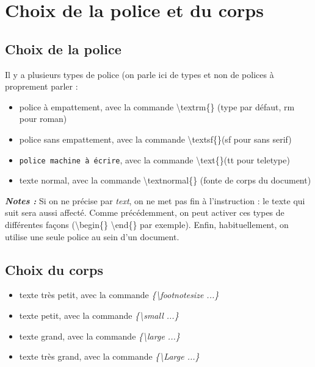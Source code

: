 \documentclass[a4paper, 10pt]{article}
\begin{document}
\section{Choix de la police et du corps}
\subsection{Choix de la police}
Il y a plusieurs types de police (on parle ici de types et non de polices à proprement parler :

\begin{itemize}

\item \textrm{police à empattement}, avec la commande \textbackslash textrm\{\} (type par défaut, rm pour roman)
\item \textsf{police sans empattement}, avec la commande \textbackslash textsf\{\}(sf pour sans serif)
\item \texttt{police machine à écrire}, avec la commande \textbackslash text\{\}(tt pour teletype)
\item \textnormal{texte normal}, avec la commande \textbackslash textnormal\{\} (fonte de corps du document)

\end{itemize}

\textit{\textbf{Notes :}} Si on ne précise par \textit{text}, on ne met pas fin à l'instruction : le texte qui suit sera aussi affecté.
Comme précédemment, on peut activer ces types de différentes façons (\textbackslash begin\{\} \textbackslash end\{\} par exemple). Enfin, habituellement, on utilise une seule police au sein d'un document.

\pagebreak %

\subsection{Choix du corps}

\begin{itemize}

\item {\footnotesize texte très petit}, avec la commande \textit{\{\textbackslash footnotesize ...\}}
\item {\small texte petit}, avec la commande \textit{\{\textbackslash small ...\}}
\item {\large texte grand}, avec la commande \textit{\{\textbackslash large ...\}}
\item {\Large texte très grand}, avec la commande \textit{\{\textbackslash Large ...\}}

\end{itemize}
\end{document}

